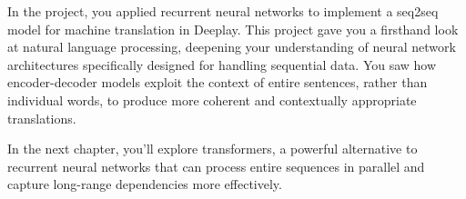 In the project, you applied recurrent neural networks to implement a seq2seq model for machine translation in Deeplay. This project gave you a firsthand look at natural language processing, deepening your understanding of neural network architectures specifically designed for handling sequential data. You saw how encoder-decoder models exploit the context of entire sentences, rather than individual words, to produce more coherent and contextually appropriate translations. 

In the next chapter, you'll explore transformers, a powerful alternative to recurrent neural networks that can process entire sequences in parallel and capture long-range dependencies more effectively.

